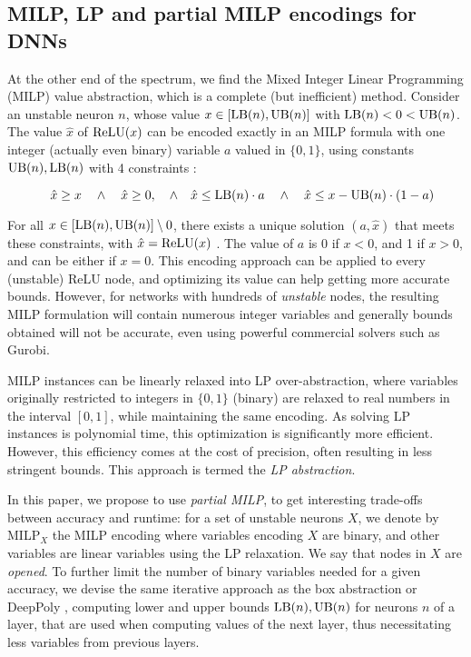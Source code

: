 \subsection{MILP, LP and partial MILP encodings for DNNs}

At the other end of the spectrum, we find the Mixed Integer Linear Programming (MILP) value abstraction, which is a complete (but inefficient) method. 
Consider an unstable neuron $n$, whose value $x \in [\mathrm{LB}(n),\mathrm{UB}(n)]$ with $\mathrm{LB}(n)<0<\mathrm{UB}(n)$.
The value $\hat{x}$ of $\mathrm{ReLU}(x)$ can be encoded exactly in an MILP formula with one 
integer (actually even binary) variable $a$ valued in $\{0,1\}$, using constants $\mathrm{UB}(n),\mathrm{LB}(n)$ with 4 constraints \cite{MILP}:

$$\quad \hat{x} \geq x \quad \wedge \quad \hat{x} \geq 0, \quad \wedge \quad \hat{x} \leq \mathrm{LB}(n) \cdot a \quad \wedge \quad \hat{x} \leq x-\mathrm{UB}(n) \cdot (1-a)$$

For all $x \in [\mathrm{LB}(n),\mathrm{UB}(n)] \setminus 0$, there exists a unique solution $(a,\hat{x})$ that meets these constraints, with $\hat{x}=\mathrm{ReLU}(x)$ \cite{MILP}. The value of $a$ is 0 if $x < 0$, and 1 if $x>0$, and can be either if $x=0$. This encoding approach can be applied to every (unstable) ReLU node, and optimizing its value can help getting more accurate bounds. However, for networks with hundreds of {\em unstable} nodes, the resulting MILP formulation will contain numerous integer variables and generally bounds obtained will not be accurate, even using powerful commercial solvers such as Gurobi.

MILP instances can be linearly relaxed into LP over-abstraction, where variables originally restricted to integers in $\{0,1\}$ (binary) are relaxed to real numbers in the interval $[0,1]$, while maintaining the same encoding. As solving LP instances is polynomial time, this optimization is significantly more efficient. However, this efficiency comes at the cost of precision, often resulting in less stringent bounds. This approach is termed the {\em LP abstraction}.

In this paper, we propose to use {\em partial MILP}, to get interesting trade-offs between accuracy and runtime: 
for a set of unstable neurons $X$, we denote by MILP$_X$ the MILP encoding where variables encoding $X$ are binary, and other variables are linear variables using the LP relaxation. We say that nodes in $X$ are {\em opened}. 
To further limit the number of binary variables needed for a given accuracy, we devise the same iterative approach as the box abstraction or DeepPoly \cite{deeppoly}, computing lower 
and upper bounds $\mathrm{LB}(n),\mathrm{UB}(n)$ for neurons $n$ of a layer, that are used when computing values of the next layer, thus necessitating less variables from previous layers. 


